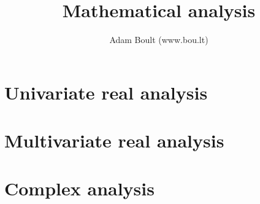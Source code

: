 \documentclass[oneside]{book}
\begin{document}
\author{Adam Boult (www.bou.lt)}
\title{Mathematical analysis}
\maketitle

\setcounter{tocdepth}{0}
\tableofcontents



\part{Univariate real analysis}















\part{Multivariate real analysis}








\part{Complex analysis}




\end{document}
